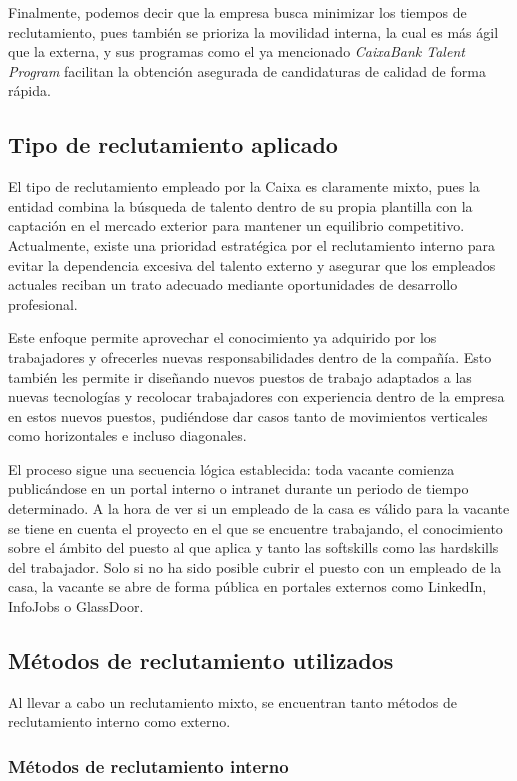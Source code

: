 Finalmente, podemos decir que la empresa busca minimizar los tiempos de reclutamiento, pues también se prioriza la movilidad interna, la cual es más ágil que la externa, y sus programas como el ya mencionado \textit{CaixaBank Talent Program} facilitan la obtención asegurada de candidaturas de calidad de forma rápida.

\subsection{Tipo de reclutamiento aplicado}

El tipo de reclutamiento empleado por la Caixa es claramente mixto, pues la entidad combina la búsqueda de talento dentro de su propia plantilla con la captación en el mercado exterior para mantener un equilibrio competitivo. Actualmente, existe una prioridad estratégica por el reclutamiento interno para evitar la dependencia excesiva del talento externo y asegurar que los empleados actuales reciban un trato adecuado mediante oportunidades de desarrollo profesional. 

Este enfoque permite aprovechar el conocimiento ya adquirido por los trabajadores y ofrecerles nuevas responsabilidades dentro de la compañía. Esto también les permite ir diseñando nuevos puestos de trabajo adaptados a las nuevas tecnologías y recolocar trabajadores con experiencia dentro de la empresa en estos nuevos puestos, pudiéndose dar casos tanto de movimientos verticales como horizontales e incluso diagonales.

El proceso sigue una secuencia lógica establecida: toda vacante comienza publicándose en un portal interno o intranet durante un periodo de tiempo determinado. A la hora de ver si un empleado de la casa es válido para la vacante se tiene en cuenta el proyecto en el que se encuentre trabajando, el conocimiento sobre el ámbito del puesto al que aplica y tanto las softskills como las hardskills del trabajador. Solo si no ha sido posible cubrir el puesto con un empleado de la casa, la vacante se abre de forma pública en portales externos como LinkedIn, InfoJobs o GlassDoor. 

\subsection{Métodos de reclutamiento utilizados}

Al llevar a cabo un reclutamiento mixto, se encuentran tanto métodos de reclutamiento interno como externo.

\subsubsection{Métodos de reclutamiento interno}

